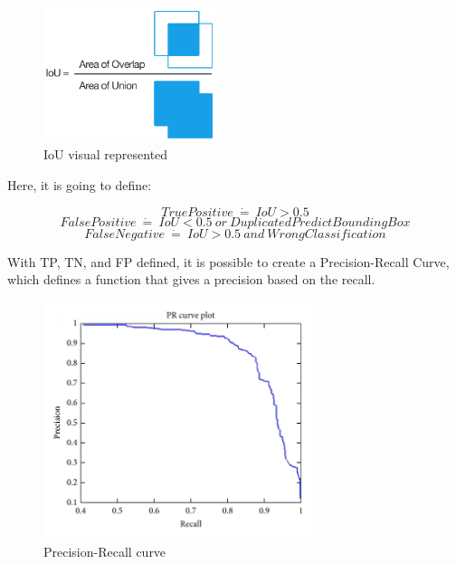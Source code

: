 \documentclass[11pt]{article}
\begin{document}
\begin{figure}[ht]
	
	\centering
	\includegraphics[width=0.45\textwidth]{iou_equation.png}
	\caption{\scriptsize IoU visual represented \cite{pyimage}}
	
\end{figure}

Here, it is going to define:

{\centering
	\begin{equation*}
	TruePositive\ \dot=\ IoU > 0.5
	\end{equation*}
	\begin{equation*}
	FalsePositive\ \dot=\ IoU < 0.5\ or \ Duplicated PredictBoundingBox
	\end{equation*}
	\begin{equation*}
	FalseNegative\ \dot=\ IoU > 0.5\ and \ WrongClassification
	\end{equation*}}

With TP, TN, and FP defined, it is possible to create a Precision-Recall Curve, which defines a function that gives a precision based on the recall.

\begin{figure}[ht]
	
	\centering
	\includegraphics[width=0.7\textwidth]{precision-recall.png}
	\caption{\scriptsize Precision-Recall curve \cite{medium:1}}
	
\end{figure}
\end{document}
